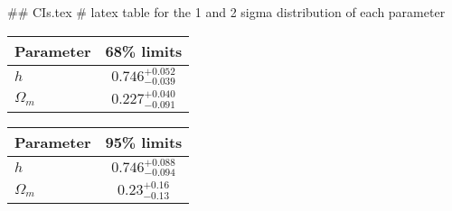 ## CIs.tex
# latex table for the 1 and 2 sigma distribution of each parameter

\begin{tabular} { l  c}
 Parameter &  68\% limits\\
\hline
{\boldmath$h              $} & $0.746^{+0.052}_{-0.039}   $\\
{\boldmath$\Omega_m       $} & $0.227^{+0.040}_{-0.091}   $\\
\hline
\end{tabular}

\begin{tabular} { l  c}
 Parameter &  95\% limits\\
\hline
{\boldmath$h              $} & $0.746^{+0.088}_{-0.094}   $\\
{\boldmath$\Omega_m       $} & $0.23^{+0.16}_{-0.13}      $\\
\hline
\end{tabular}
